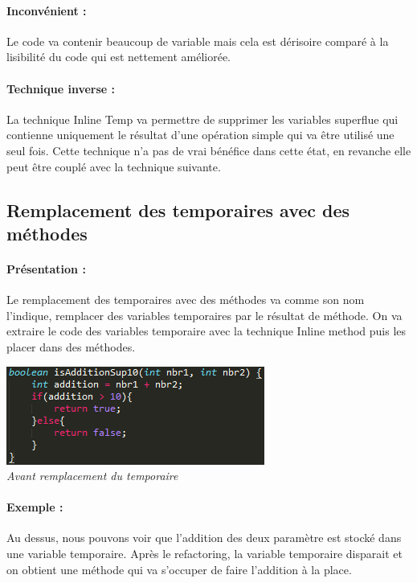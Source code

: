 \documentclass[a4paper,twoside,12pt,openright]{report}
\begin{document}
\paragraph{Inconvénient :}
Le code va contenir beaucoup de variable mais cela est dérisoire comparé à la lisibilité du code qui est nettement améliorée.

\paragraph{Technique inverse :}
La technique Inline Temp va permettre de supprimer les variables superflue qui contienne uniquement le résultat d'une opération simple qui va être utilisé une seul fois. Cette technique n'a pas de vrai bénéfice dans cette état, en revanche elle peut être couplé avec la technique suivante.

\subsection{Remplacement des temporaires avec des méthodes}
\paragraph{Présentation :}
Le remplacement des temporaires avec des méthodes va comme son nom l'indique, remplacer des variables temporaires par le résultat de méthode. On va extraire le code des variables temporaire avec la technique Inline method puis les placer dans des méthodes.

\begin{center}
\includegraphics[scale=1]{Image/Remplacement_Temp_Methode.png}\\
\itshape{Avant remplacement du temporaire}
\end{center}

\paragraph{Exemple :}
Au dessus, nous pouvons voir que l'addition des deux paramètre est stocké dans une variable temporaire. Après le refactoring, la variable temporaire disparait et on obtient une méthode qui va s'occuper de faire l'addition à la place.
\end{document}

